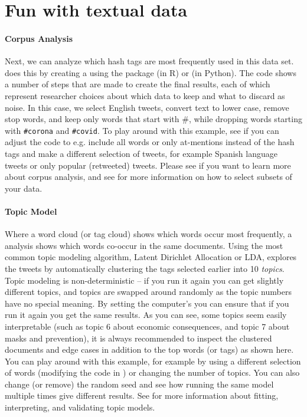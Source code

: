 
\section{Fun with textual data}

\paragraph{Corpus Analysis} Next, we can analyze which hash tags are most frequently used in this data set.
 does this by creating a  using the package  (in R)
or \sklearn (in Python).
The code shows a number of steps that are made to create the final results, each of which represent
researcher choices about which data to keep and what to discard as noise.
In this case,  we select English tweets, convert text to lower case, remove stop words, and keep only words that start with \#,
while dropping words starting with \verb+#corona+ and \verb+#covid+.
To play around with this example,
see if you can adjust the code to e.g. include all words or only at-mentions instead of the hash tags
and make a different selection of tweets, for example Spanish language tweets or only popular (retweeted) tweets.
Please see  if you want to learn more about corpus analysis,
and see  for more information on how to select subsets of your data.


\paragraph{Topic Model}
Where a word cloud (or tag cloud) shows which words occur most frequently,
a  analysis shows which words co-occur in the same documents.
Using the most common topic modeling algorithm, Latent Dirichlet Allocation or LDA,
 explores the tweets by automatically clustering the tags selected earlier into 10 \emph{topics}.
Topic modeling is non-deterministic -- if you run it again you can get slightly different topics,
and topics are swapped around randomly as the topic numbers have no special meaning.
By setting the computer's  you can ensure that if you run it again you get the same results.
As you can see, some topics seem easily interpretable (such as topic 6 about economic consequences,
and topic 7 about masks and prevention), it is always recommended to inspect the clustered documents
and edge cases in addition to the top words (or tags) as shown here.
You can play around with this example, for example by using a different selection of words
(modifying the code in ) or changing the number of topics.
You can also change (or remove) the random seed and see how running the same model multiple times give different results. 
See  for more information about fitting, interpreting, and validating topic models.

